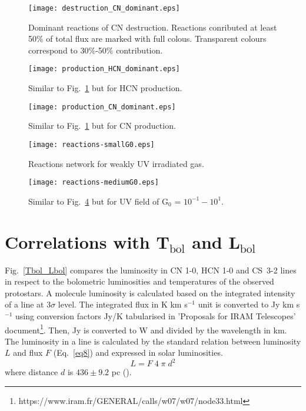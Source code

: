 \documentclass{aa}
\begin{document}
\begin{appendix}
\begin{figure} \texttt{[image: destruction\_CN\_dominant.eps]} \caption{Dominant reactions
of CN destruction. Reactions conributed at least 50$\%$ of total flux are marked with full colous.
Transparent colours correspond to 30$\%$-50$\%$ contribution.} \label{CN_dest} \end{figure}

\begin{figure} 
\texttt{[image: production\_HCN\_dominant.eps]} 
\caption{Similar to Fig.~\ref{CN_dest} but for HCN production.} 
\label{HCN_prod} 
\end{figure}

\begin{figure} 
\texttt{[image: production\_CN\_dominant.eps]} 
\caption{Similar to Fig.~\ref{CN_dest} but for CN production.} 
\label{CN_prod}
\end{figure}


\begin{figure} 
\texttt{[image: reactions-smallG0.eps]} 
\caption{Reactions network for weakly UV irradiated gas.} 
\label{reactions_smallG0} 
\end{figure}

\begin{figure} 
\texttt{[image: reactions-mediumG0.eps]} 
\caption{Similar to Fig.~\ref{reactions_smallG0} but for UV field of G$_0$ = $10^{-1} - 10^{1}$.}
\label{reactions_mediumG0} 
\end{figure}


\section{Correlations with T$_\mathrm{bol}$ and L$_\mathrm{bol}$} 

Fig.~\ref{Tbol_Lbol} compares the luminosity in CN 1-0, HCN 1-0 and \mbox{CS 3-2} lines in respect to the bolometric luminosities and temperatures of the observed protostars. A molecule luminosity is calculated based on the integrated intensity of a line at 3$\sigma$ level. The integrated flux in K km s$^{-1}$ unit is converted to Jy km s$^{-1}$ using conversion factors Jy/K tabularised in 'Proposals for IRAM Telescopes' document\footnote{https://www.iram.fr/GENERAL/calls/w07/w07/node33.html}. Then, Jy is converted to W and divided by the wavelength in km. The luminosity in a line is calculated by the standard relation between luminosity $L$ and flux $F$ (Eq.~\ref{eq8}) and expressed in solar luminosities.
\begin{equation} 
\label{eq8} 
L = F \; 4 \; \pi \; d^{2}
\end{equation}
where distance $d$ is $436 \pm 9.2$ pc (\citealt{Ort17}).


\end{appendix}
\end{document}
